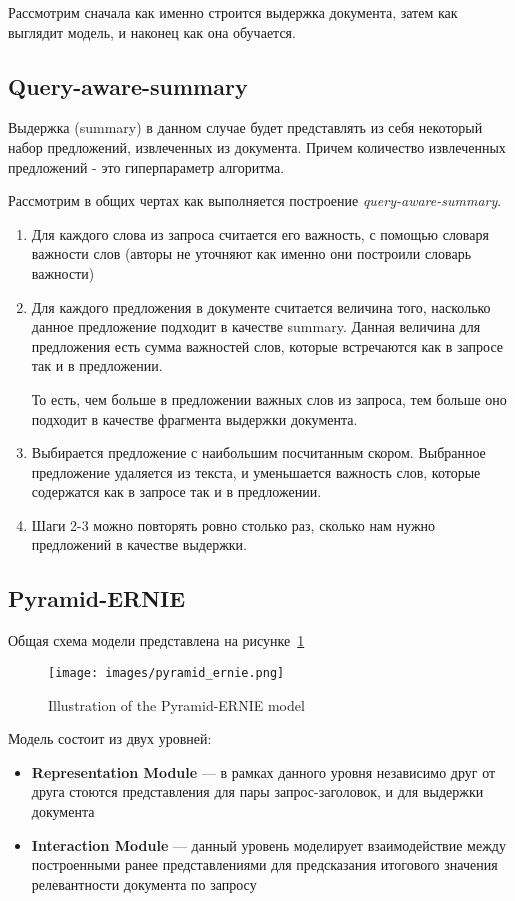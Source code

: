 Рассмотрим сначала как именно строится выдержка документа, затем как выглядит модель, и наконец как она обучается.

\subsection*{Query-aware-summary}

Выдержка (summary) в данном случае будет представлять из себя некоторый набор предложений, извлеченных из документа.
Причем количество извлеченных предложений - это гиперпараметр алгоритма.

Рассмотрим в общих чертах как выполняется построение \textit{query-aware-summary}.
\begin{enumerate}
    \item Для каждого слова из запроса считается его важность, с помощью словаря важности слов (авторы не уточняют как именно они построили словарь важности)
    \item Для каждого предложения в документе считается величина того, насколько данное предложение подходит в качестве summary.
        Данная величина для предложения есть сумма важностей слов, которые встречаются как в запросе так и в предложении.
        
        То есть, чем больше в предложении важных слов из запроса, тем больше оно подходит в качестве фрагмента выдержки документа.
    \item Выбирается предложение с наибольшим посчитанным скором.
        Выбранное предложение удаляется из текста, и уменьшается важность слов, которые содержатся как в запросе так и в предложении.
    \item Шаги 2-3 можно повторять ровно столько раз, сколько нам нужно предложений в качестве выдержки.
\end{enumerate}

\subsection*{Pyramid-ERNIE}

Общая схема модели представлена на рисунке~\ref{fig:pyramid_ernie}

\begin{figure}[ht]
  \centering
  \texttt{[image: images/pyramid\_ernie.png]}
  \caption{\footnotesize{Illustration of the Pyramid-ERNIE model}}
  \label{fig:pyramid_ernie}
\end{figure}

Модель состоит из двух уровней:
\begin{itemize}
    \item \textbf{Representation Module} --- в рамках данного уровня независимо друг от друга стоются представления для пары запрос-заголовок, и для выдержки документа
    \item \textbf{Interaction Module} --- данный уровень моделирует взаимодействие между построенными ранее представлениями для предсказания итогового значения релевантности документа по запросу
\end{itemize}

